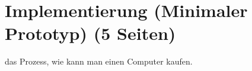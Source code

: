 
\chapter{Implementierung (Minimaler Prototyp) (5 Seiten)}

das Prozess, wie kann man einen Computer kaufen.